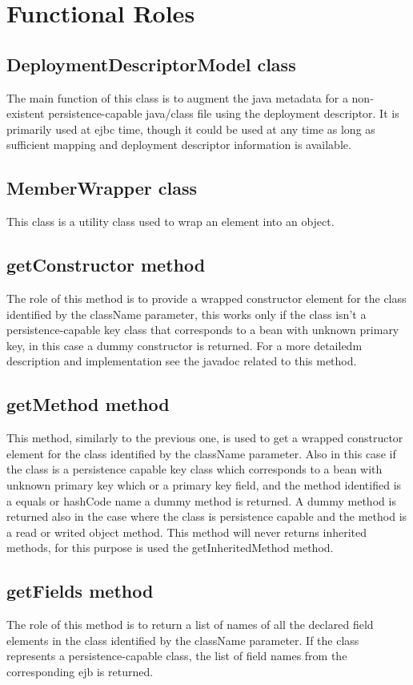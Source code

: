 \section{Functional Roles}
\subsection{DeploymentDescriptorModel class}
The main function of this class is to augment the java metadata for a non-existent persistence-capable java/class file using the deployment descriptor. It is primarily used at ejbc time, though it could be used at any time as long as sufficient mapping and deployment descriptor information is available.

\subsection{MemberWrapper class}
This class is a utility class used to wrap an element into an object.

\subsection{getConstructor method}
The role of this method is to provide a wrapped constructor element for the class identified by the className parameter, this works only if the class isn't a persistence-capable key class that corresponds to a bean with unknown primary key, in this case a dummy constructor is returned. For a more detailedm description and implementation see the javadoc related to this method.

\subsection{getMethod method}
This method, similarly to the previous one, is used to get a wrapped constructor element for the class identified by the className parameter. Also in this case if the class is a persistence capable key class which corresponds to a bean with unknown primary key which or a primary key field, and the method identified is a equals or hashCode name a dummy method is returned. A dummy method is returned also in the case where the class is persistence capable and the method is a read or writed object method. This method will never returns inherited methods, for this purpose is used the getInheritedMethod method.

\subsection{getFields method}
The role of this method is to return a list of names of all the declared field elements in the class identified by the className parameter. If the class represents a persistence-capable class, the list of field names from the corresponding ejb is returned.


